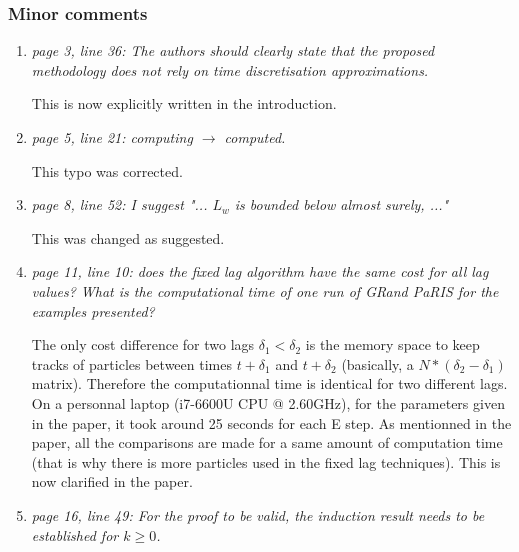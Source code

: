 \documentclass[12pt]{article}
\newcommand{\1}{\mathrm{1}}
\begin{document}
\subsubsection*{Minor comments}
\begin{enumerate}
\item{\em page 3, line 36: The authors should clearly state that the proposed methodology
does not rely on time discretisation approximations.}

\vspace{.3cm}

This is now explicitly written in the introduction.

\item{\em page 5, line 21: computing $\longrightarrow$ computed.}

\vspace{.3cm}

This typo was corrected.

\item {\em page 8, line 52: I suggest "... $L_w$ is bounded below almost surely, ..."}

\vspace{.3cm}

This was changed as suggested.

\item {\em page 11, line 10: does the fixed lag algorithm have the same cost for all lag values?
What is the computational time of one run of GRand PaRIS for the examples presented?}

\vspace{.3cm}

The only cost difference for two lags $\delta_1 < \delta_2$ is the memory space to keep tracks of particles between times $t+\delta_1$ and $t+\delta_2$ (basically, a $N*(\delta_2 - \delta_1)$ matrix). Therefore the computationnal time is identical for two different lags.\\
On a personnal laptop  (i7-6600U CPU @ 2.60GHz), for the parameters given in the paper, it took around 25 seconds for each E step. As mentionned in the paper, all the comparisons are made for a same amount of computation time (that is why there is more particles used in the fixed lag techniques). 
This is now clarified in the paper.

\item {\em page 16, line 49: For the proof to be valid, the induction result needs to be established for $k\ge 0$.}

\vspace{.3cm}

\end{enumerate}
\end{document}
